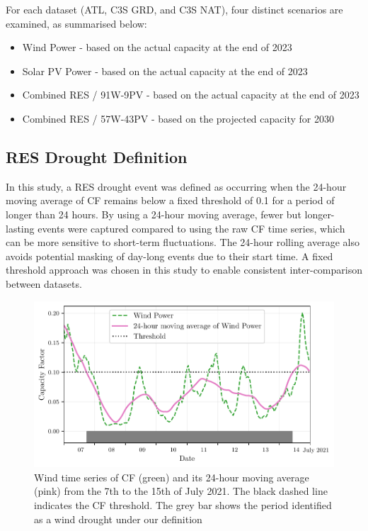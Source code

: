 \documentclass[preprint, 12pt]{elsarticle}
\begin{document}
For each dataset (ATL, C3S GRD, and C3S NAT), four distinct scenarios are examined, as summarised below:

\begin{itemize}
	\item Wind Power - based on the actual capacity at the end of 2023
	\item Solar PV Power - based on the actual capacity at the end of 2023
	\item Combined RES / 91W-9PV - based on the actual capacity at the end of 2023
	\item Combined RES / 57W-43PV - based on the projected capacity for 2030
\end{itemize}

\subsection{RES Drought Definition}
\label{sec:res_drought}

In this study, a RES drought event was defined as occurring when the 24-hour moving average of CF remains below a fixed threshold of 0.1 for a period of longer than 24 hours. By using a 24-hour moving average, fewer but longer-lasting events were captured compared to using the raw CF time series, which can be more sensitive to short-term fluctuations. The 24-hour rolling average also avoids potential masking of day-long events due to their start time. A fixed threshold approach was chosen in this study to enable consistent inter-comparison between datasets.

\begin{figure}[ht!]
	\centering
	\includegraphics[width=\textwidth]{droughts_methodology.pdf}
	\caption{Wind time series of CF (green) and its 24-hour moving average (pink) from the 7th to the 15th of July 2021. The black dashed line indicates the CF threshold. The grey bar shows the period identified as a wind drought under our definition}
	\label{fig:find_res_droughts}
\end{figure}
\end{document}
